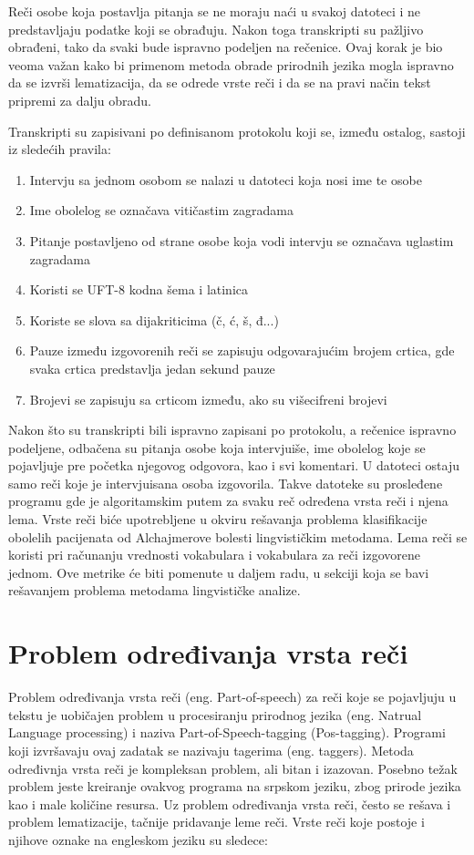 \documentclass[12pt,oneside]{memoir}
\begin{document}
Reči osobe koja postavlja pitanja se ne moraju naći u svakoj datoteci i ne predstavljaju podatke koji se obrađuju. Nakon toga transkripti su pažljivo obrađeni, tako da svaki bude ispravno podeljen na rečenice. Ovaj korak je bio veoma važan kako bi primenom metoda obrade prirodnih jezika mogla ispravno da se izvrši lematizacija, da se odrede vrste reči i da se na pravi način tekst pripremi za dalju obradu.

Transkripti su zapisivani po definisanom protokolu koji se, između ostalog, sastoji iz sledećih pravila:

\begin{enumerate}
\item Intervju sa jednom osobom se nalazi u datoteci koja nosi ime te osobe
\item Ime obolelog se označava vitičastim zagradama
\item Pitanje postavljeno od strane osobe koja vodi intervju se označava uglastim zagradama
\item Koristi se UFT-8 kodna šema i latinica
\item Koriste se slova sa dijakriticima (č, ć, š, đ...)
\item Pauze između izgovorenih reči se zapisuju odgovarajućim brojem crtica, gde svaka crtica predstavlja jedan sekund pauze
\item Brojevi se zapisuju sa crticom između, ako su višecifreni brojevi
\end{enumerate}

Nakon što su transkripti bili ispravno zapisani po protokolu, a rečenice ispravno podeljene, odbačena su pitanja osobe koja intervjuiše, ime obolelog koje se pojavljuje pre početka njegovog odgovora, kao i svi komentari. U datoteci ostaju samo reči koje je intervjuisana osoba izgovorila. Takve datoteke su prosleđene programu gde je algoritamskim putem za svaku reč određena vrsta reči i njena lema. Vrste reči biće upotrebljene u okviru rešavanja problema klasifikacije obolelih pacijenata od Alchajmerove bolesti lingvističkim metodama. Lema reči se koristi pri računanju vrednosti vokabulara i vokabulara za reči izgovorene jednom. Ove metrike će biti pomenute u daljem radu, u sekciji koja se bavi rešavanjem problema metodama lingvističke analize.

\section{Problem određivanja vrsta reči}

Problem određivanja vrsta reči (eng. Part-of-speech) za reči koje se pojavljuju u tekstu je uobičajen problem u procesiranju prirodnog jezika (eng. Natrual Language processing) i naziva Part-of-Speech-tagging (Pos-tagging).  Programi koji izvršavaju ovaj zadatak se nazivaju tagerima (eng. taggers).  Metoda određivnja vrsta reči je kompleksan problem, ali bitan i izazovan. Posebno težak problem jeste kreiranje ovakvog programa na srpskom jeziku, zbog prirode jezika kao i male količine resursa.  Uz problem određivanja vrsta reči, često se rešava i problem lematizacije, tačnije pridavanje leme reči. Vrste reči koje postoje i njihove oznake na engleskom jeziku su sledece:
\end{document}
